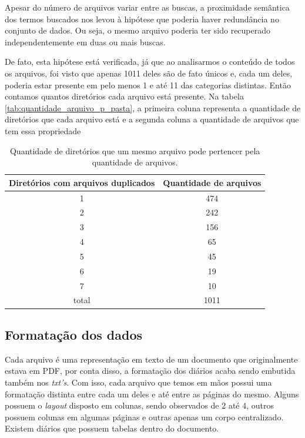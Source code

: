\documentclass[10pt, a4paper]{article}
\begin{document}
Apesar do número de arquivos variar entre as buscas, a proximidade semântica dos termos buscados nos levou à hipótese que poderia haver redundância no conjunto de dados. Ou seja, o mesmo arquivo poderia ter sido recuperado independentemente em duas ou mais buscas. 
 
De fato, esta hipótese está verificada, já que ao analisarmos o conteúdo de todos os arquivos, foi visto que apenas 1011 deles são de fato únicos e, cada um deles, poderia estar presente em pelo menos 1 e até 11 das categorias distintas. Então contamos quantos diretórios cada arquivo está presente. Na tabela \ref{tab:quantidade_arquivo_p_pasta}, a primeira coluna representa a quantidade de diretórios que cada arquivo está e a segunda coluna a quantidade de arquivos que tem essa propriedade

\begin{table}[H]
    \centering
    \begin{tabular}{c|c}
        Diretórios com arquivos duplicados & Quantidade de arquivos \\ \hline
        1 &  474 \\
        2 &  242 \\
        3 &  156 \\
        4 &  65  \\
        5 &  45  \\
        6 &  19  \\
        7 &  10  \\
        \hline
        total & 1011 \\
    \end{tabular}
    \caption{Quantidade de diretórios que um mesmo arquivo pode pertencer pela quantidade de arquivos.}
    \label{tab:my_label}
\end{table}

\subsection{Formatação dos dados}

Cada arquivo é uma representação em texto de um documento que originalmente estava em PDF, por conta disso, a formatação dos diários acaba sendo embutida também nos \textit{txt's}. Com isso, cada arquivo que temos em mãos possui uma formatação distinta entre cada um deles e até entre as páginas do mesmo. Alguns possuem o \textit{layout} disposto em colunas, sendo observados de 2 até 4, outros possuem colunas em algumas páginas e outras apenas um corpo centralizado. Existem diários que possuem tabelas dentro do documento.
\end{document}
